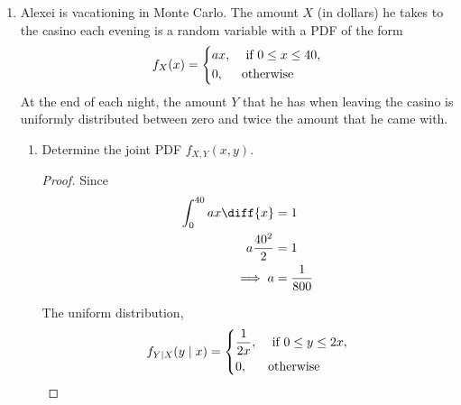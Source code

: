 \documentclass[paper=usletter, fontsize=12pt]{article}
\begin{document}
\begin{enumerate}
\begin{proof}
        \end{proof}

        \item Alexei is vacationing in Monte Carlo. The amount $X$ (in dollars)
        he takes to the casino each evening is a random variable with a PDF of
        the form
        \begin{equation*}
            f_X(x)=
            \begin{dcases}
                ax, & \text{ if } 0 \le x \le 40,\\
                0, & \text{otherwise}
            \end{dcases}
        \end{equation*}
        At the end of each night, the amount $Y$ that he has when leaving the
        casino is uniformly distributed between zero and twice the amount that
        he came with.
        \begin{enumerate}

            \item Determine the joint PDF $f_{X,Y}(x,y)$.
            \begin{proof}

                Since
                \begin{align*}
                    \int_{0}^{40}ax\diff{x} & = 1\\
                    a\frac{40^2}{2} & = 1\\
                    \implies a & = \frac{1}{800}
                \end{align*}

                The uniform distribution,
                \begin{equation*}
                    f_{Y \mid X}(y \mid x) =
                    \begin{dcases}
                        \frac{1}{2x}, & \text{ if } 0 \le y \le 2x,\\
                        0, & \text{otherwise}
                    \end{dcases}
                \end{equation*}


\end{proof}
\end{enumerate}
\end{enumerate}
\end{document}
